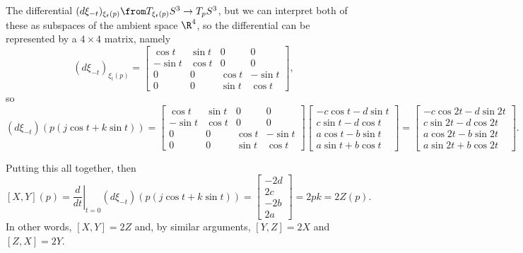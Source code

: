 The differential $(d\xi_{-t})_{\xi_t(p)}\from T_{\xi_t(p)}S^3 \to T_p S^3$, but we can interpret both of these as subspaces of the ambient space $\R^4$, so the differential can be represented by a $4 \times 4$ matrix, namely
\[
	(d \xi_{-t})_{\xi_t(p)} = \begin{bmatrix} \cos t& \sin t & 0 & 0 \\ -\sin t & \cos t & 0 & 0 \\ 0 & 0 & \cos t & -\sin t \\ 0 & 0 & \sin t & \cos t \end{bmatrix},
\]
so
\[
	(d\xi_{-t})(p(j\cos t + k \sin t)) = \begin{bmatrix} \cos t& \sin t & 0 & 0 \\ -\sin t & \cos t & 0 & 0 \\ 0 & 0 & \cos t & -\sin t \\ 0 & 0 & \sin t & \cos t \end{bmatrix} \begin{bmatrix} -c \cos t - d \sin t \\ c \sin t - d \cos t \\ a \cos t - b \sin t \\ a \sin t + b \cos t \end{bmatrix} = \begin{bmatrix} -c \cos 2t - d \sin 2t \\ c \sin 2t - d \cos 2t \\ a \cos 2t - b \sin 2t \\ a \sin 2t + b \cos 2t \end{bmatrix}.
\]

Putting this all together, then
\[
	[X,Y](p) =\left. \frac{d}{dt}\right|_{t=0} (d\xi_{-t})(p(j\cos t + k \sin t)) = \begin{bmatrix} -2d \\ 2c \\ -2b \\ 2a \end{bmatrix} = 2pk = 2Z(p).
\]
In other words, $[X,Y] = 2Z$ and, by similar arguments, $[Y,Z] = 2X$ and $[Z,X] = 2Y$.